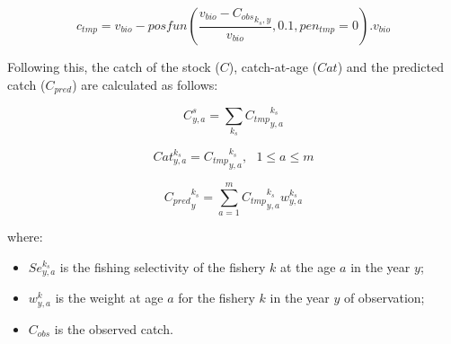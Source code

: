\documentclass{article}
\begin{document}
\begin{equation}
c_{tmp} = v_{bio}-posfun\left(\frac{v_{bio} - {C_{obs}}_{k_s,y}}{v_{bio}} , 0.1 , pen_{tmp}=0 \right).v_{bio}
\end{equation}


Following this, the catch of the stock ($C$), catch-at-age ($Cat$) and the predicted catch ($C_{pred}$) are calculated as follows:

\begin{equation}
C^s_{y,a}=\sum_{k_s}{C_{tmp}}^{k_s}_{y,a} 
\end{equation}

\begin{equation}
Cat^{k_s}_{y,a}={C_{tmp}}^{k_s}_{y,a},  \  \  \ 1\leq a \leq m
\end{equation}

\begin{equation}
{C_{pred}}^{k_s}_y=\sum_{a=1}^{m}{C_{tmp}}^{k_s}_{y,a} w_{y,a}^{k_s}
\end{equation} 

where:        
\begin{itemize}

    \item $Se_{y,a}^{k_s}$ is the fishing selectivity of the fishery $k$ at the age $a$ in the year $y$;
    
    \item $w_{y,a}^{k}$ is the weight at age $a$ for the fishery $k$ in the year $y$ of observation;
    
    \item $C_{obs}$ is the observed catch.
    
    

 
\end{itemize}
\end{document}

